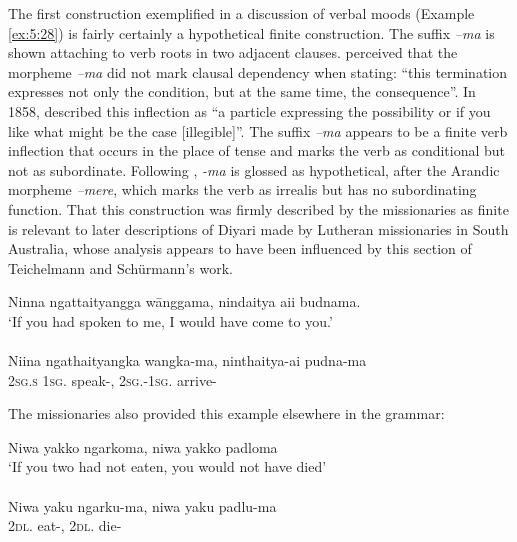 The first construction exemplified in a discussion of verbal moods (Example \ref{ex:5:28}) is fairly certainly a hypothetical finite construction. The suffix \textit{–ma} is shown attaching to verb roots in two adjacent clauses. \citet[19]{teichelmann1940} perceived that the morpheme \textit{–ma} did not mark clausal dependency when stating: “this termination expresses not only the condition, but at the same time, the consequence”. In 1858, \citet[19]{teichelmann_verb_1858} described this inflection as “a particle expressing the possibility or if you like what might be the case [illegible]”. The suffix \textit{–ma} appears to be a finite verb inflection that occurs in the place of tense and marks the verb as conditional but not as subordinate. Following \citet[233]{wilkins_mparntwe_1989}, \textit{-ma} is glossed as hypothetical, after the Arandic morpheme \textit{–mere}, which marks the verb as irrealis but has no subordinating function. That this construction was firmly described by the missionaries as finite is relevant to later descriptions of Diyari made by Lutheran missionaries in South Australia, whose analysis appears to have been influenced by this section of Teichelmann and Schürmann’s work. 

\ea\label{ex:5:28}
Ninna  ngattaityangga  wānggama,          nindaitya aii            budnama.  \\
\glt  `If you had spoken to me, I would have come to you.' \\
\citep[19]{teichelmann_outlines_1840} \\
\gll Niina   ngathaityangka   wangka-ma,         ninthaitya-ai\footnotemark{}             pudna-ma \\
2\textsc{sg}.\textsc{s}    1\textsc{sg}.	           speak-,      2\textsc{sg}.-1\textsc{sg}.     arrive-                               \\
\z

The missionaries also provided this example elsewhere in the grammar: 

\ea\label{ex:5:29}
Niwa        yakko   ngarkoma,     niwa         yakko      padloma \\
\glt `If you two had not eaten,   you would not have died' \\
\citep[67]{teichelmann_outlines_1840} \\
\gll Niwa          yaku   ngarku-ma,    niwa          yaku     padlu-ma \\
    2\textsc{dl}.       eat-,    2\textsc{dl}.      die-\\
\z

